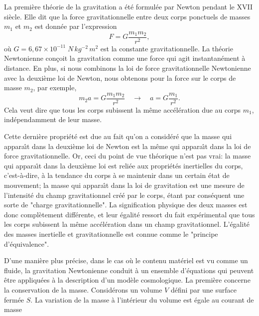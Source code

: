 \documentclass[a4paper,12pt]{report}
\theoremstyle{plain}
\theoremstyle{plain}
\begin{document}
La premi\`ere th\'eorie de la gravitation a \'et\'e formul\'ee par
Newton pendant le XVII si\`ecle.  Elle dit que la force
gravitationnelle entre deux corps ponctuels de masses $m_1$ et
$m_2$ est donn\'ee par l'expression
\begin{equation}
F = G\frac{m_1m_2}{r^2},
\end{equation}
o\`u $G = 6, 67\times10^{-11}\;N\, kg^{-2}\, m^{2}$ est la constante
gravitationnelle.  La th\'eorie Newtonienne con\c{c}oit la
gravitation comme une force qui agit instantan\'ement \`a distance. 
En plus,  si nous combinons la loi de force gravitationnelle
Newtonienne avec la deuxi\`eme loi de Newton,  nous obtenons pour
la force sur le corps de masse $m_2$,  par exemple, 
\begin{equation}
m_2a = G\frac{m_1m_2}{r^2} \quad \rightarrow \quad a =
G\frac{m_1}{r^2}.
\end{equation}
Cela veut dire que tous les corps subissent la m\^eme
acc\'el\'eration due au corps $m_1$,  ind\'ependamment de leur
masse. 
\par
Cette derni\`ere propri\'et\'e est due au fait qu'on a
consid\'er\'e que la masse qui appara\^{\i}t dans la deuxi\`eme
loi de Newton est la m\^eme qui appara\^{\i}t dans la loi de force
gravitationnelle.  Or,  ceci du point de vue th\'eorique n'est pas
vrai:  la masse qui appara\^{\i}t dans la deuxi\`eme loi est
reli\'ee aux propri\'et\'es inertielles du corps,  c'est-\`a-dire, 
\`a la tendance du corps \`a se maintenir dans un certain \'etat de
mouvement; la masse qui appara\^{\i}t dans la loi de
gravitation est une mesure de l'intensit\'e du champ
gravitationnel cr\'e\'e par le corps,  \'etant par cons\'equent une
sorte de "charge gravitationnelle".  La signification physique des
deux masses est donc compl\`etement diff\'erente,  et leur
\'egalit\'e ressort du fait exp\'erimental que tous les corps
subissent la m\^eme acc\'el\'eration dans un champ gravitationnel. 
L'\'egalit\'e des masses inertielle et gravitationnelle est connue
comme le "principe d'\'equivalence". 
\par
D'une mani\`ere plus pr\'ecise,  dans le cas o\`u le contenu
mat\'eriel est vu comme un fluide,  la gravitation Newtonienne
conduit \`a un ensemble d'\'equations qui peuvent \^etre
appliqu\'ees \`a la description d'un mod\`ele cosmologique.  La
premi\`ere concerne la conservation de la masse.  Consid\'erons un
volume $V$ d\'efini par une surface ferm\'ee $S$.  La variation de
la masse \`a l'int\'erieur du volume est \'egale au courant de masse
\end{document}
